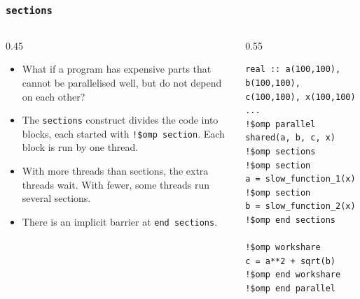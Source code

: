 \begin{frame}[fragile]
  \frametitle{\texttt{sections}}
  \begin{columns}[T]
    \begin{column}{0.45\textwidth}
      \begin{itemize}
        \item What if a program has expensive parts that cannot be parallelised well, but do not depend on each other?
        \item The \texttt{sections} construct divides the code into blocks, each started with \texttt{!\$omp section}. Each block is run by one thread.
        \item With more threads than sections, the extra threads wait. With fewer, some threads run several sections.
        \item There is an implicit barrier at \texttt{end sections}.
      \end{itemize}
    \end{column}

    \begin{column}{0.55\textwidth}
      \begin{lstlisting}
real :: a(100,100), b(100,100), c(100,100), x(100,100)
...
!$omp parallel shared(a, b, c, x)
!$omp sections
!$omp section
a = slow_function_1(x)
!$omp section
b = slow_function_2(x)
!$omp end sections

!$omp workshare
c = a**2 + sqrt(b)
!$omp end workshare
!$omp end parallel
      \end{lstlisting}
    \end{column}
  \end{columns}
\end{frame}


